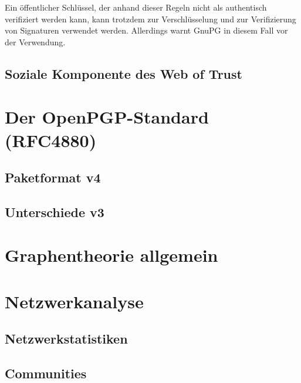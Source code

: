Ein öffentlicher Schlüssel, der anhand dieser Regeln nicht als
authentisch verifiziert werden kann, kann trotzdem zur Verschlüsselung
und zur Verifizierung von Signaturen verwendet werden. Allerdings
warnt GnuPG in diesem Fall vor der Verwendung.

\subsection{Soziale Komponente des Web of Trust}
\label{sec:sozi-komp-des}



\section{Der OpenPGP-Standard (RFC4880)}
\label{ch:Grundlagen:sec:OpenPGP}

\subsection{Paketformat v4}
\label{ch:Grundlagen:sec:OpenPGP:subsec:PaketFormat}

\subsection{Unterschiede v3}
\label{ch:Grundlagen:sec:OpenPGP:subsec:v3Format}

\section{Graphentheorie allgemein}
\label{ch:Grundlagen:sec:Graphentheorie}

\section{Netzwerkanalyse}
\label{ch:Grundlagen:sec:Netzwerkanalyse}

\subsection{Netzwerkstatistiken}
\label{ch:Grundlagen:sec:Netzwerkanalyse:subsec:Statistiken}

\subsection{Communities}
\label{ch:Grundlagen:sec:Netzwerkanalyse:subsec:Communities}

